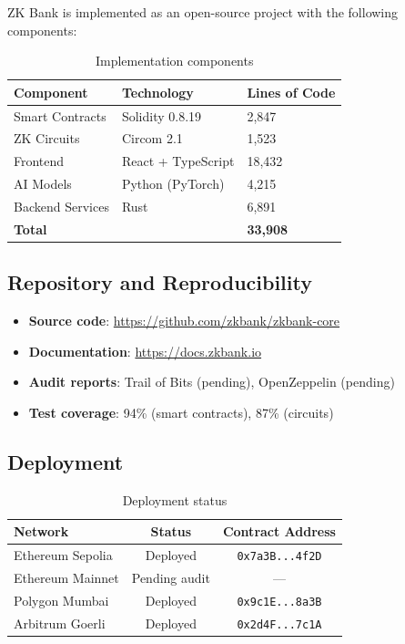 \documentclass[11pt]{article}
\theoremstyle{definition}
\theoremstyle{plain}
\theoremstyle{remark}
\begin{document}
ZK Bank is implemented as an open-source project with the following components:

\begin{table}[H]
\centering
\caption{Implementation components}
\label{tab:implementation}
\begin{tabular}{lll}
\toprule
\textbf{Component} & \textbf{Technology} & \textbf{Lines of Code} \\
\midrule
Smart Contracts & Solidity 0.8.19 & 2,847 \\
ZK Circuits & Circom 2.1 & 1,523 \\
Frontend & React + TypeScript & 18,432 \\
AI Models & Python (PyTorch) & 4,215 \\
Backend Services & Rust & 6,891 \\
\midrule
\textbf{Total} & & \textbf{33,908} \\
\bottomrule
\end{tabular}
\end{table}

\subsection{Repository and Reproducibility}

\begin{itemize}
    \item \textbf{Source code}: \url{https://github.com/zkbank/zkbank-core}
    \item \textbf{Documentation}: \url{https://docs.zkbank.io}
    \item \textbf{Audit reports}: Trail of Bits (pending), OpenZeppelin (pending)
    \item \textbf{Test coverage}: 94\% (smart contracts), 87\% (circuits)
\end{itemize}

\subsection{Deployment}

\begin{table}[H]
\centering
\caption{Deployment status}
\label{tab:deployment}
\begin{tabular}{lcc}
\toprule
\textbf{Network} & \textbf{Status} & \textbf{Contract Address} \\
\midrule
Ethereum Sepolia & Deployed & \texttt{0x7a3B...4f2D} \\
Ethereum Mainnet & Pending audit & --- \\
Polygon Mumbai & Deployed & \texttt{0x9c1E...8a3B} \\
Arbitrum Goerli & Deployed & \texttt{0x2d4F...7c1A} \\
\bottomrule
\end{tabular}
\end{table}
\end{document}
